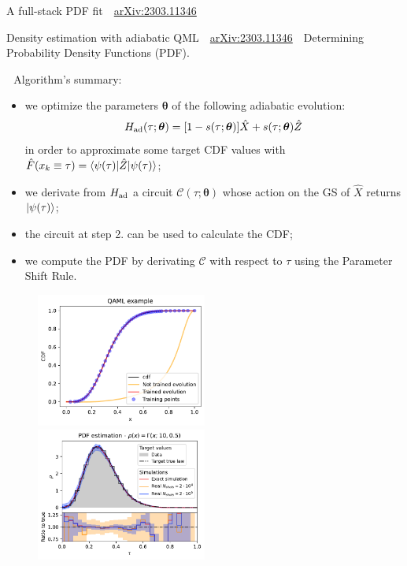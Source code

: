 \documentclass[8pt, xcolor={svgnames}]{beamer}
\begin{document}
\begin{frame}{A full-stack PDF fit \hfill \faBook\,\, \href{https://arxiv.org/abs/2303.11346}{arXiv:2303.11346}}
\begin{multicols}{2}
\end{multicols}

\end{frame}


\begin{frame}{Density estimation with adiabatic QML  \hfill \faBook\,\, \href{https://arxiv.org/abs/2303.11346}{arXiv:2303.11346}}
\small
\faCrosshairs\,\, Determining Probability Density Functions (PDF).

\faFlash\,\, Algorithm's summary:
\begin{itemize}[noitemsep]
\item[1.] we optimize the parameters $\bm{\theta}$ of the following adiabatic evolution:
\begin{equation} 
H_{\rm ad}(\tau; \bm{\theta}) = [1-s(\tau; \bm{\theta})] \hat{X} + s(\tau; \bm{\theta})\hat{Z}
\end{equation}
in order to approximate some target CDF values with $\hat{F}(x_k \equiv \tau) = \braket{\psi(\tau)|\hat{Z}|\psi(\tau)}$;
\item[2.] we derivate from $H_{\rm ad}$ a circuit $\mathcal{C}(\tau; \bm{\theta})$ whose action 
on the GS of $\hat{X}$ returns $\ket{\psi(\tau)}$;
\item[3.] the circuit at step 2. can be used to calculate the CDF;
\item[4.] we compute the PDF by derivating $\mathcal{C}$ with respect to $\tau$ 
using the Parameter Shift Rule.
\end{itemize}
\begin{figure}  
    \includegraphics[width=0.5\textwidth]{figures/evolution.pdf}%
    \includegraphics[width=0.5\textwidth]{figures/PDF.pdf}
\end{figure}


\end{frame}
\end{document}
